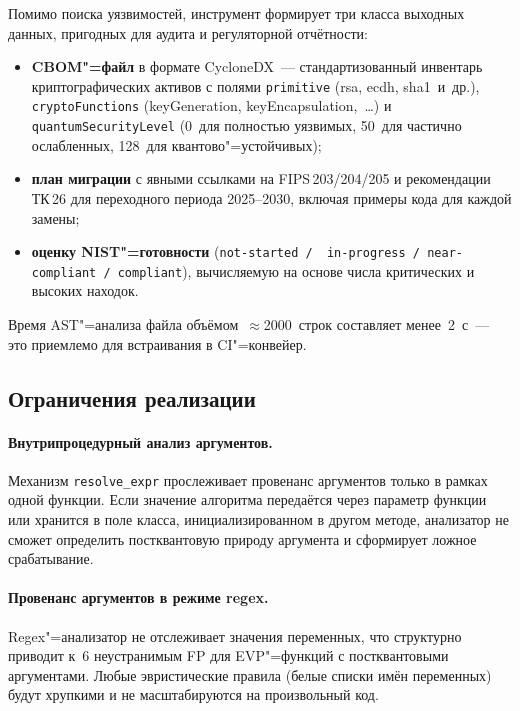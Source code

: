 Помимо поиска уязвимостей, инструмент формирует три класса
выходных данных, пригодных для аудита и регуляторной отчётности:
\begin{itemize}
  \item \textbf{CBOM"=файл} в формате CycloneDX~--- стандартизованный
    инвентарь криптографических активов с полями
    \texttt{primitive} (rsa, ecdh, sha1~и~др.),
    \texttt{cryptoFunctions} (keyGeneration, keyEncapsulation,~\dots)
    и \texttt{quantumSecurityLevel} (0~для полностью уязвимых,
    50~для частично ослабленных, 128~для квантово"=устойчивых);
  \item \textbf{план миграции} с явными ссылками на FIPS\,203/204/205
    и рекомендации ТК\,26 для переходного периода 2025--2030, включая
    примеры кода для каждой замены;
  \item \textbf{оценку NIST"=готовности} (\texttt{not-started\,/\,
    in-progress\,/\,near-compliant\,/\,compliant}), вычисляемую
    на основе числа критических и высоких находок.
\end{itemize}
Время AST"=анализа файла объёмом~$\approx$2000~строк составляет
менее~2~с~--- это приемлемо для встраивания в CI"=конвейер.

\subsection{Ограничения реализации}

\paragraph{Внутрипроцедурный анализ аргументов.}
Механизм \texttt{resolve\_expr} прослеживает провенанс аргументов
только в рамках одной функции.
Если значение алгоритма передаётся через параметр функции или
хранится в поле класса, инициализированном в другом методе,
анализатор не сможет определить постквантовую природу аргумента
и сформирует ложное срабатывание.

\paragraph{Провенанс аргументов в режиме regex.}
Regex"=анализатор не отслеживает значения переменных, что
структурно приводит к~6 неустранимым FP для EVP"=функций
с постквантовыми аргументами.
Любые эвристические правила (белые списки имён переменных)
будут хрупкими и не масштабируются на произвольный код.

